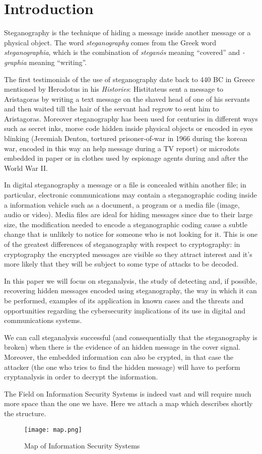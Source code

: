 \documentclass[../../main.tex]{subfiles}
\begin{document}
\section{Introduction}

Steganography is the technique of hiding a message inside another message or a
physical object.\cite{steganography-definition}
The word \emph{steganography} comes from the Greek word
\emph{steganographia}, which is the combination of \emph{steganós} meaning
``covered'' and \emph{-graphia} meaning ``writing''.

The first testimonials of the use of steganography date back to 440 BC in Greece
mentioned by Herodotus in his \emph{Histories}: Histitateus sent a message to
Aristagoras by writing a text message on the shaved head of one of his servants
and then waited till the hair of the servant had regrow to sent him to
Aristagoras.
Moreover steganography has been used for centuries in different ways such as
secret inks, morse code hidden inside physical objects or encoded in eyes
blinking (Jeremiah Denton, tortured prisoner-of-war in 1966 during the korean
war, encoded in this way an help message during a TV report) or microdots
embedded in paper or in clothes used by espionage agents during and after the
World War II.

In digital steganography a message or a file is concealed within another file;
in particular, electronic communications may contain a steganographic coding
inside a information vehicle such as a document, a program or a media file
(image, audio or video).
Media files are ideal for hiding messages since due to their large size, the
modification needed to encode a steganographic coding cause a subtle change that
is unlikely to notice for someone who is not looking for it.
This is one of the greatest differences of steganography with respect to
cryptography: in cryptography the encrypted messages are visible so they attract
interest and it's more likely that they will be subject to some type of attacks
to be decoded.

In this paper we will focus on steganalysis, the study of detecting and, if
possible, recovering hidden messages encoded using steganography, the way in
which it can be performed, examples of its application in known cases and
the threats and opportunities regarding the cybersecurity implications of its
use in digital and communications systems.

We can call steganalysis successful (and consequentially that the steganography
is broken) when there is the evidence of an hidden message in the cover signal.
Moreover, the embedded information can also be crypted, in that case the
attacker (the one who tries to find the hidden message) will have to perform
cryptanalysis in order to decrypt the information.

The Field on Information Security Systems is indeed vast and will require much
more space than the one we have. Here we attach a map which describes shortly
the structure.

\begin{figure}[h]
    \centering
    \caption{Map of Information Security Systems \cite{modern-text-hiding}}
    \texttt{[image: map.png]}
\end{figure}
\end{document}
